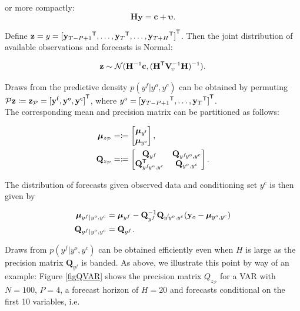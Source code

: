 \documentclass[notitlepage,a4paper,12pt]{article}
\newcommand{\transpose}[1]{{#1}^{\sf{T}}}
\begin{document}
or more compactly:
\begin{equation*}
    \mathbf{H} \mathbf{y} = \mathbf{c} + \boldsymbol{\upsilon}.
\end{equation*}

Define $\mathbf{z}={y} = \transpose{[\transpose{\mathbf{y}_{T-P+1}}, \dots, \transpose{\mathbf{y}_T}, \dots, \transpose{\mathbf{y}_{T+H}}]}$. Then the joint distribution of available observations and forecasts is Normal:

$$
\mathbf{z} \sim \mathcal{N}(\mathbf{H}^{-1} \mathbf{c}, (\transpose{\mathbf{H}} \mathbf{V}^{-1}_{\!\upsilon}\mathbf{H})^{-1}).
$$

Draws from the predictive density $p(y^f| y^o, y^c)$ can be obtained by permuting $\mathcal{P} \mathbf{z} \coloneqq \mathbf{z}_{\mathcal{P}} = \transpose{[\mathbf{y}^{\sf{f}}, \mathbf{y}^{\sf{o}}, \mathbf{y}^{\sf{c}}]}$, where $y^o = \transpose{[\transpose{\mathbf{y}_{T-P+1}}, \dots, \transpose{\mathbf{y}_T}]}$.\\

The corresponding mean and precision matrix can be partitioned as follows:

\begin{align*}
    \boldsymbol{\mu}_{z_{\mathcal{P}}} &= 
    \coloneqq
    \begin{bmatrix}
        \boldsymbol{\mu}_{y^{\sf{f}}} \\
        \boldsymbol{\mu}_{y^{\sf{o}}}
    \end{bmatrix}
    ,\\
    \mathbf{Q}_{z_{\mathcal{P}}} &= 
    \coloneqq
    \begin{bmatrix}
        \mathbf{Q}_{y^f} & \mathbf{Q}_{y^f\!y^o, y^c} \\
        \mathbf{Q}^{\sf{T}}_{y^f\!y^o, y^c} & \mathbf{Q}_{y^o, y^c}
    \end{bmatrix}
    .
\end{align*}

The distribution of forecasts given observed data and conditioning set $y^c$ is then given by 

\begin{align*}
    \boldsymbol{\mu}_{y^f|y^o, y^c} &= 
    \boldsymbol{\mu}_{y^f} - \mathbf{Q}_{y^f}^{-1} \mathbf{Q}_{y^{\sf{f}}\!y^o, y^c} (\mathbf{y}_o - \boldsymbol{\mu}_{y^o, y^c})\\
    \mathbf{Q}_{y^f|y^o, y^c} &= \mathbf{Q}_{y^f}.
\end{align*}

Draws from $p(y^f|y^o, y^c)$ can be obtained efficiently even when $H$ is large as the precision matrix $\mathbf{Q}_{y^f}$ is banded. As above, we illustrate this point by way of an example: Figure \ref{figQVAR} shows the precision matrix $Q_{z_{\mathcal{P}}}$ for a VAR with $N=100$, $P=4$, a forecast horizon of $H=20$ and forecasts conditional on the first 10 variables, i.e. 
\end{document}
